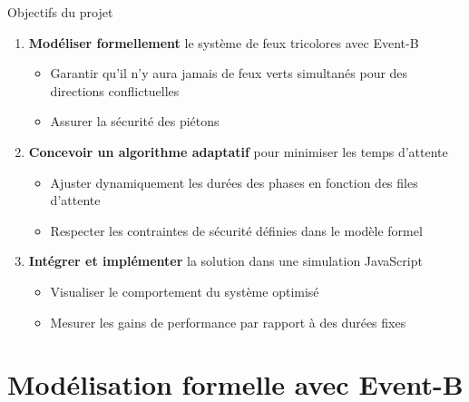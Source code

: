 \begin{frame}{Objectifs du projet}
  \begin{enumerate}
    \item<1-> \textbf{Modéliser formellement} le système de feux tricolores avec Event-B
    \begin{itemize}
      \item Garantir qu'il n'y aura jamais de feux verts simultanés pour des directions conflictuelles
      \item Assurer la sécurité des piétons
    \end{itemize}
    
    \item<2-> \textbf{Concevoir un algorithme adaptatif} pour minimiser les temps d'attente
    \begin{itemize}
      \item Ajuster dynamiquement les durées des phases en fonction des files d'attente
      \item Respecter les contraintes de sécurité définies dans le modèle formel
    \end{itemize}
    
    \item<3-> \textbf{Intégrer et implémenter} la solution dans une simulation JavaScript
    \begin{itemize}
      \item Visualiser le comportement du système optimisé
      \item Mesurer les gains de performance par rapport à des durées fixes
    \end{itemize}
  \end{enumerate}
\end{frame}

\section{Modélisation formelle avec Event-B}

